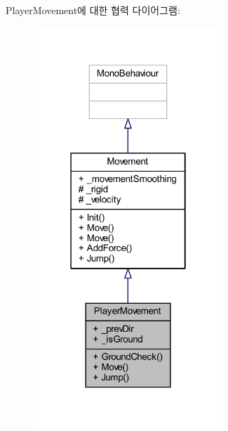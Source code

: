 Player\+Movement에 대한 협력 다이어그램\+:
\nopagebreak
\begin{figure}[H]
\begin{center}
\leavevmode
\includegraphics[width=202pt]{d5/df4/class_player_movement__coll__graph}
\end{center}
\end{figure}
